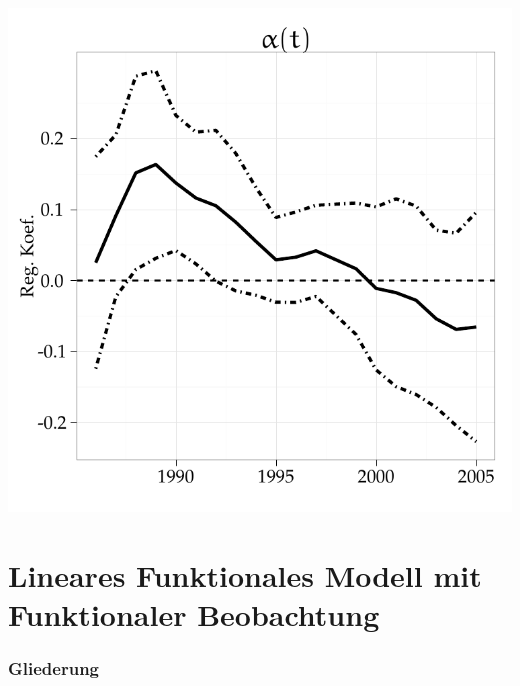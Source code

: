 \documentclass[xcolor=dvipsnames, compress, serif, professionalfont, handout]{beamer}
\newenvironment{knitrout}{}{} %
\renewenvironment{knitrout}{\begin{footnotesize}}{\end{footnotesize}}
\begin{document}
\begin{frame}[fragile]
\begin{minipage}{0.48\textwidth}
\begin{knitrout}
{\centering \includegraphics[width=\linewidth,height=\linewidth]{figure/graphics-GR_ANOVA_alpha} 

}


\end{knitrout}

  \end{minipage}
\end{frame}

%
%

\section{Lineares Funktionales Modell mit Funktionaler Beobachtung}
\begin{frame}[fragile]
  \frametitle{Gliederung}
\end{frame}

% 
%
\end{document}
